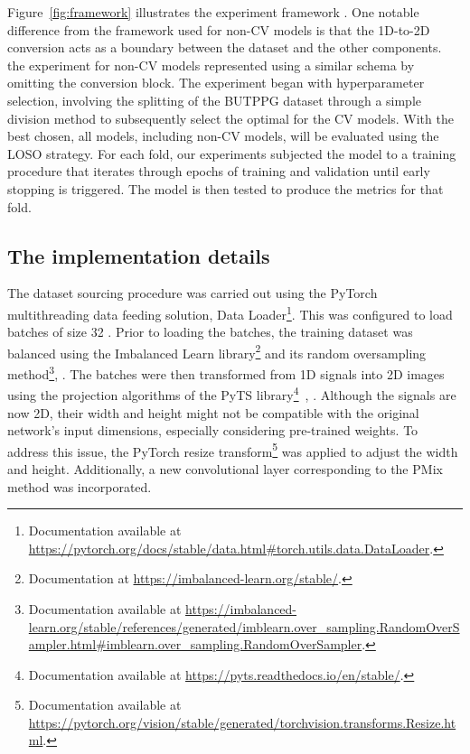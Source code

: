 Figure~\ref{fig:framework} illustrates the experiment framework . One notable difference from the framework used for non-\gls{CV} models is that the 1D-to-2D conversion acts as a boundary between the dataset and the other components.  the experiment for non-\gls{CV} models  represented using a similar schema by omitting the conversion block. The experiment began with hyperparameter selection, involving the splitting of the \gls{BUTPPG} dataset through a simple division method to subsequently select the optimal  for the \gls{CV} models. With the best  chosen, all models, including non-\gls{CV} models, will be evaluated using the \gls{LOSO} strategy. For each fold, our experiments subjected the model to a training procedure that iterates through epochs of training and validation until early stopping is triggered. The model is then tested to produce the metrics for that fold.

\subsection{The implementation details}

The dataset sourcing procedure was carried out using the PyTorch multithreading data feeding solution, Data Loader\footnote{Documentation available at \url{https://pytorch.org/docs/stable/data.html\#torch.utils.data.DataLoader}.}. This was configured to load batches of size 32 . Prior to loading the batches, the training dataset was balanced using the Imbalanced Learn library\footnote{Documentation at \url{https://imbalanced-learn.org/stable/}.} and its random oversampling method\footnote{Documentation available at \url{https://imbalanced-learn.org/stable/references/generated/imblearn.over_sampling.RandomOverSampler.html\#imblearn.over_sampling.RandomOverSampler}.}, . The batches were then transformed from 1D signals into 2D images using the projection algorithms of the PyTS library\footnote{Documentation available at \url{https://pyts.readthedocs.io/en/stable/}.}~\cite{PyTS}, . Although the signals are now 2D, their width and height might not be compatible with the original network's input dimensions, especially considering pre-trained weights. To address this issue, the PyTorch resize transform\footnote{Documentation available at \url{https://pytorch.org/vision/stable/generated/torchvision.transforms.Resize.html}.} was applied to adjust the width and height. Additionally, a new convolutional layer corresponding to the \gls{PMix} method was incorporated.

